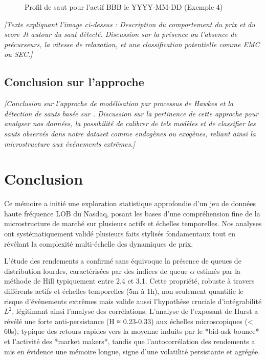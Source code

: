 \documentclass[10pt,a4paper]{article}
\theoremstyle{definition}
\theoremstyle{remark}
\begin{document}
\begin{itemize}
    \vspace{1cm}

    \begin{figure}[H]
        \centering
        \fbox{\rule{0pt}{4cm}\qquad\rule{8cm}{0pt}} %
        \caption{Profil de saut pour l'actif BBB le YYYY-MM-DD (Exemple 4)}
        \label{fig:jump_example_4}
    \end{figure}
    \textit{[Texte expliquant l'image ci-dessus : Description du comportement du prix et du score Jt autour du saut détecté. Discussion sur la présence ou l'absence de précurseurs, la vitesse de relaxation, et une classification potentielle comme EMC ou SEC.]}

    \subsection{Conclusion sur l'approche}

    \textit{[Conclusion sur l'approche de modélisation par processus de Hawkes et la détection de sauts basée sur \cite{marcaccioli2021exogenous}. Discussion sur la pertinence de cette approche pour analyser nos données, la possibilité de calibrer de tels modèles et de classifier les sauts observés dans notre dataset comme endogènes ou exogènes, reliant ainsi la microstructure aux événements extrêmes.]}

\newpage
\section*{Conclusion}


    Ce mémoire a initié une exploration statistique approfondie d'un jeu de données haute fréquence LOB du Nasdaq, posant les bases d'une compréhension fine de la microstructure de marché sur plusieurs actifs et échelles temporelles. Nos analyses ont systématiquement validé plusieurs faits stylisés fondamentaux tout en révélant la complexité multi-échelle des dynamiques de prix.

    \vspace{0.5cm}

    L'étude des rendements a confirmé sans équivoque la présence de queues de distribution lourdes, caractérisées par des indices de queue $\alpha$ estimés par la méthode de Hill typiquement entre 2.4 et 3.1. Cette propriété, robuste à travers différents actifs et échelles temporelles (5m à 1h), non seulement quantifie le risque d'événements extrêmes mais valide aussi l'hypothèse cruciale d'intégrabilité $L^2$, légitimant ainsi l'analyse des corrélations. L'analyse de l'exposant de Hurst a révélé une forte anti-persistance (H ≈ 0.23-0.33) aux échelles microscopiques (< 60s), typique des retours rapides vers la moyenne induits par le *bid-ask bounce* et l'activité des *market makers*, tandis que l'autocorrélation des rendements a mis en évidence une mémoire longue, signe d'une volatilité persistante et agrégée.


\end{itemize}
\end{document}
